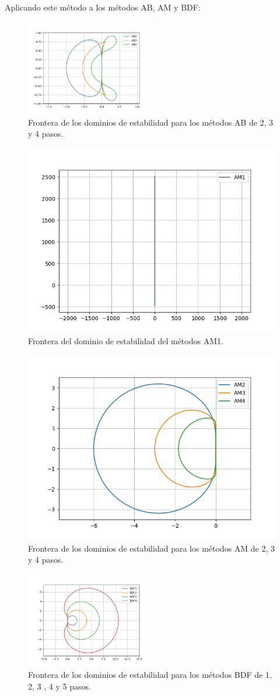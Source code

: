 Aplicando este método a los métodos AB, AM y BDF:

\begin{figure}[H]
    \centering
    \includegraphics[width=0.5\textwidth]{imagenes/Metodos_AB.png}
    \caption*{Frontera de los dominios de estabilidad para los métodos AB de 2, 3 y 4 pasos.}
\end{figure}

\begin{figure}[H]
    \centering
    \includegraphics[width=0.5\linewidth]{imagenes/AM1.png}
    \caption*{Frontera del dominio de estabilidad del métodos AM1.}
\end{figure}


\begin{figure}[H]
    \centering
    \includegraphics[width=0.5\linewidth]{imagenes/AM.png}
    \caption*{Frontera de los dominios de estabilidad para los métodos AM de 2, 3 y 4 pasos.}
\end{figure}

\begin{figure}[H]
    \centering
    \includegraphics[width=0.5\textwidth]{imagenes/BDF.png}
    \caption*{Frontera de los dominios de estabilidad para los métodos BDF de 1, 2, 3 , 4 y 5 pasos.}
\end{figure}

